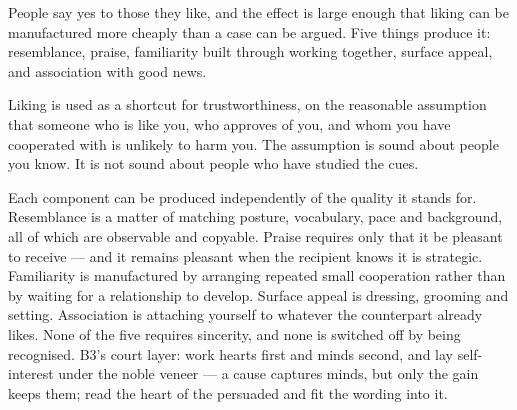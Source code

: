


\begin{core}
People say yes to those they like, and the effect is large enough that liking can be manufactured more cheaply than a case can be argued. Five things produce it: resemblance, praise, familiarity built through working together, surface appeal, and association with good news.
\end{core}

\begin{mechanism}
Liking is used as a shortcut for trustworthiness, on the reasonable assumption that someone who is like you, who approves of you, and whom you have cooperated with is unlikely to harm you. The assumption is sound about people you know. It is not sound about people who have studied the cues.

Each component can be produced independently of the quality it stands for. Resemblance is a matter of matching posture, vocabulary, pace and background, all of which are observable and copyable. Praise requires only that it be pleasant to receive --- and it remains pleasant when the recipient knows it is strategic. Familiarity is manufactured by arranging repeated small cooperation rather than by waiting for a relationship to develop. Surface appeal is dressing, grooming and setting. Association is attaching yourself to whatever the counterpart already likes. None of the five requires sincerity, and none is switched off by being recognised. B3's court layer: work hearts first and minds second, and lay self-interest under the noble veneer --- a cause captures minds, but only the gain keeps them; read the heart of the persuaded and fit the wording into it.
\end{mechanism}


